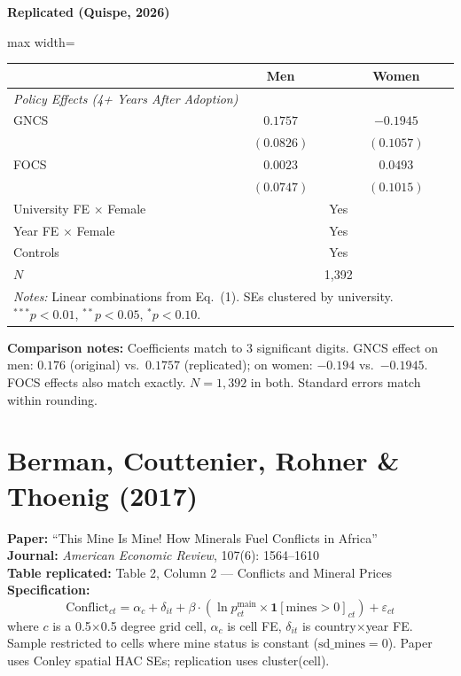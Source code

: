 \documentclass[11pt,a4paper]{article}
\begin{document}
\begin{minipage}[t]{0.48\textwidth}
\centering
\textbf{\large Replicated (Quispe, 2026)}
\vspace{0.3cm}

\begin{adjustbox}{max width=\textwidth}
\begin{tabular}{lcc}
\toprule
 & Men & Women \\
\midrule
\multicolumn{3}{l}{\textit{Policy Effects (4+ Years After Adoption)}} \\[3pt]
GNCS & $0.1757$ & $-0.1945$ \\
 & $(0.0826)$ & $(0.1057)$ \\[0.3em]
FOCS & $0.0023$ & $0.0493$ \\
 & $(0.0747)$ & $(0.1015)$ \\[0.3em]
\midrule
University FE $\times$ Female & \multicolumn{2}{c}{Yes} \\
Year FE $\times$ Female & \multicolumn{2}{c}{Yes} \\
Controls & \multicolumn{2}{c}{Yes} \\
$N$ & \multicolumn{2}{c}{1,392} \\
\bottomrule
\multicolumn{3}{p{0.95\textwidth}}{\footnotesize\textit{Notes:} Linear combinations from Eq.\ (1). SEs clustered by university. $^{***}p<0.01$, $^{**}p<0.05$, $^{*}p<0.10$.}
\end{tabular}
\end{adjustbox}
\end{minipage}

\vspace{1cm}
\textbf{Comparison notes:} Coefficients match to 3 significant digits. GNCS effect on men: $0.176$ (original) vs.\ $0.1757$ (replicated); on women: $-0.194$ vs.\ $-0.1945$. FOCS effects also match exactly. $N = 1{,}392$ in both. Standard errors match within rounding.

\newpage

\section{Berman, Couttenier, Rohner \& Thoenig (2017)}

\textbf{Paper:} ``This Mine Is Mine! How Minerals Fuel Conflicts in Africa''\\
\textbf{Journal:} \textit{American Economic Review}, 107(6): 1564--1610\\
\textbf{Table replicated:} Table 2, Column 2 --- Conflicts and Mineral Prices\\
\textbf{Specification:}
\[
\text{Conflict}_{ct} = \alpha_c + \delta_{it} + \beta \cdot (\ln p^{\text{main}}_{ct} \times \mathbf{1}[\text{mines}>0]_{ct}) + \varepsilon_{ct}
\]
where $c$ is a 0.5$\times$0.5 degree grid cell, $\alpha_c$ is cell FE, $\delta_{it}$ is country$\times$year FE. Sample restricted to cells where mine status is constant ($\text{sd\_mines}=0$). Paper uses Conley spatial HAC SEs; replication uses cluster(cell).
\end{document}

